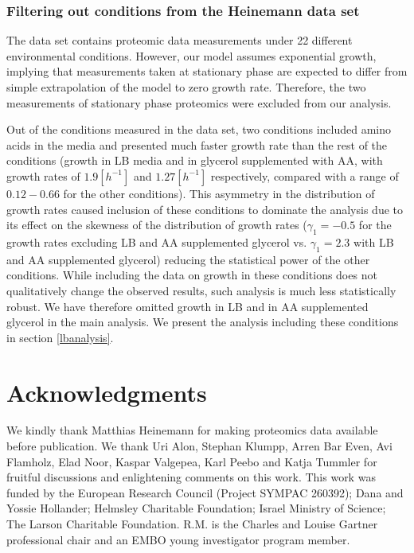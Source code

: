 \documentclass{article}
\begin{document}
\subsubsection{Filtering out conditions from the Heinemann data set}
\label{heinemanncond} 

The \cite{Heinemann2015} data set contains proteomic data measurements under 22 different environmental conditions.
However, our model assumes exponential growth, implying that measurements taken at stationary phase are expected to differ from simple extrapolation of the model to zero growth rate.
Therefore, the two measurements of stationary phase proteomics were excluded from our analysis.

Out of the conditions measured in the \cite{Heinemann2015} data set, two conditions included amino acids in the media and presented much faster growth rate than the rest of the conditions (growth in LB media and in glycerol supplemented with AA, with growth rates of $1.9[h^{-1}]$ and $1.27[h^{-1}]$ respectively, compared with a range of $0.12-0.66$ for the other conditions).
This asymmetry in the distribution of growth rates caused inclusion of these conditions to dominate the analysis due to its effect on the skewness of the distribution of growth rates ($\gamma_1=-0.5$ for the growth rates excluding LB and AA supplemented glycerol vs. $\gamma_1=2.3$ with LB and AA supplemented glycerol) reducing the statistical power of the other conditions.
While including the data on growth in these conditions does not qualitatively change the observed results, such analysis is much less statistically robust.
We have therefore omitted growth in LB and in AA supplemented glycerol in the main analysis.
We present the analysis including these conditions in section \ref{lbanalysis}.



\section{Acknowledgments}
We kindly thank Matthias Heinemann for making proteomics data available before publication.
We thank Uri Alon,  Stephan Klumpp, Arren Bar Even, Avi Flamholz, Elad Noor, Kaspar Valgepea, Karl Peebo and Katja Tummler for fruitful discussions and enlightening comments on this work.
This work was funded by the European Research Council (Project SYMPAC 260392); Dana and Yossie Hollander; Helmsley Charitable Foundation; Israel Ministry of Science; The Larson Charitable Foundation.
R.M. is the Charles and Louise Gartner professional chair and an EMBO young investigator program member.
\end{document}
